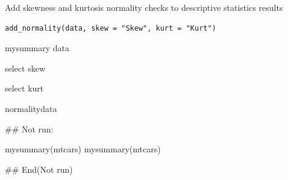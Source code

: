 \documentclass[a4paper]{book}
\begin{document}
%
\begin{Description}
Add skewness and kurtosis normality checks to descriptive statistics results
\end{Description}
%
\begin{Usage}
\begin{verbatim}
add_normality(data, skew = "Skew", kurt = "Kurt")
\end{verbatim}
\end{Usage}
%
\begin{Arguments}
\begin{ldescription}
\item[\code{data}] mysummary data

\item[\code{skew}] select skew

\item[\code{kurt}] select kurt
\end{ldescription}
\end{Arguments}
%
\begin{Value}
normalitydata
\end{Value}
%
\begin{Examples}
\begin{ExampleCode}

\#\# Not run: 

mysummary(mtcars)
mysummary(mtcars)%



## End(Not run)

\end{ExampleCode}
\end{Examples}
\end{document}
